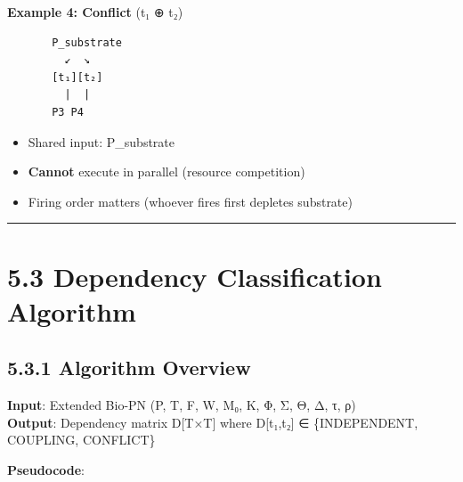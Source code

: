 \textbf{Example 4: Conflict} (t₁ ⊕ t₂)

\begin{lstlisting}
       P_substrate
         ↙  ↘
       [t₁][t₂]
         |  |
       P3 P4
\end{lstlisting}

\begin{itemize}
\tightlist
\item
  Shared input: P\_substrate
\item
  \textbf{Cannot} execute in parallel (resource competition)
\item
  Firing order matters (whoever fires first depletes substrate)
\end{itemize}

\begin{center}\rule{0.5\linewidth}{0.5pt}\end{center}

\hypertarget{dependency-classification-algorithm}{%
\section{5.3 Dependency Classification
Algorithm}\label{dependency-classification-algorithm}}

\hypertarget{algorithm-overview}{%
\subsection{5.3.1 Algorithm Overview}\label{algorithm-overview}}

\textbf{Input}: Extended Bio-PN (P, T, F, W, M₀, K, Φ, Σ, Θ, Δ, τ, ρ)\\
\textbf{Output}: Dependency matrix D{[}T×T{]} where D{[}t₁,t₂{]} ∈
\{INDEPENDENT, COUPLING, CONFLICT\}

\textbf{Pseudocode}:

